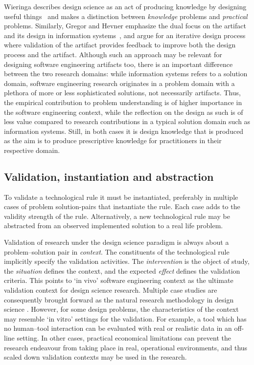 \documentclass[graybox]{svmult}
\begin{document}


Wieringa describes design science as an act of producing knowledge by designing useful things~\cite{wieringa_design_2009} and makes a distinction between \emph{knowledge} problems and \emph{practical} problems. Similarly, Gregor and Hevner emphasize the dual focus on the artifact and its design in information systems~\cite{gregor_positioning_2013}, and argue for an iterative design process where validation of the artifact provides feedback  to improve both the design process and the artifact. Although such an approach may be relevant for designing software engineering artifacts too, there is an important difference between the two research domains: while information systems refers to a solution domain, software engineering research originates in a problem domain with a plethora of more or less sophisticated solutions, not necessarily artifacts. Thus, the empirical contribution to problem understanding is of higher importance in the software engineering context, while the reflection on the design as such is of less value compared to research contributions in a typical solution domain such as information systems. Still, in both cases it is design knowledge that is produced as the aim is to produce prescriptive knowledge for practitioners in their respective domain. 

 

\subsection{Validation, instantiation and abstraction}

To validate a technological rule it must be instantiated, preferably in multiple cases of problem solution-pairs that instantiate the rule. Each case adds to the validity strength of the rule. Alternatively,  a new technological rule may be abstracted from an observed implemented solution to a real life problem.

Validation of research under the design science paradigm is always about a problem--solution pair in \emph{context}. The constituents of the technological rule implicitly specify the validation activities. The \emph{intervention} is the object of study, the \emph{situation} defines the context, and the expected \emph{effect} defines the validation criteria. This points to `in vivo' software engineering context as the ultimate validation context for design science research. Multiple case studies are consequently brought forward as the natural research methodology in design science \cite{van_aken_management_2004}. However, for some design problems, the characteristics of the context may resemble `in vitro' settings for the validation. For example, a tool which has no human--tool interaction can be evaluated with real or realistic data in an off-line setting. In other cases, practical economical limitations can prevent the research endeavour from taking place in real, operational environments, and thus scaled down validation contexts may be used in the research. 
\end{document}
